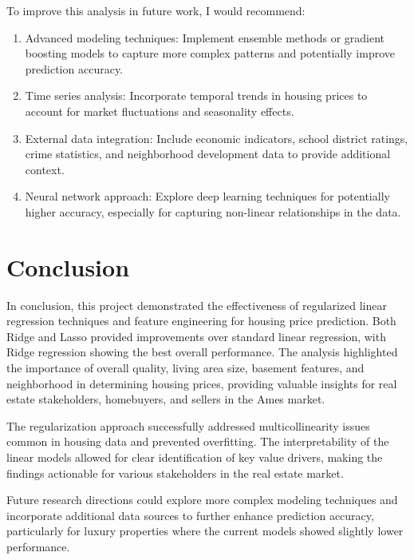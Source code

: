 \documentclass{article}
\begin{document}
To improve this analysis in future work, I would recommend:
\begin{enumerate}
    \item Advanced modeling techniques: Implement ensemble methods or gradient boosting models to capture more complex patterns and potentially improve prediction accuracy.
    \item Time series analysis: Incorporate temporal trends in housing prices to account for market fluctuations and seasonality effects.
    \item External data integration: Include economic indicators, school district ratings, crime statistics, and neighborhood development data to provide additional context.
    \item Neural network approach: Explore deep learning techniques for potentially higher accuracy, especially for capturing non-linear relationships in the data.
\end{enumerate}

\section{Conclusion}

In conclusion, this project demonstrated the effectiveness of regularized linear regression techniques and feature engineering for housing price prediction. Both Ridge and Lasso provided improvements over standard linear regression, with Ridge regression showing the best overall performance. The analysis highlighted the importance of overall quality, living area size, basement features, and neighborhood in determining housing prices, providing valuable insights for real estate stakeholders, homebuyers, and sellers in the Ames market.

The regularization approach successfully addressed multicollinearity issues common in housing data and prevented overfitting. The interpretability of the linear models allowed for clear identification of key value drivers, making the findings actionable for various stakeholders in the real estate market.

Future research directions could explore more complex modeling techniques and incorporate additional data sources to further enhance prediction accuracy, particularly for luxury properties where the current models showed slightly lower performance.
\end{document}
